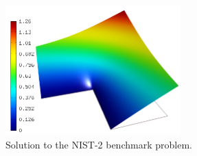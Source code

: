 \documentclass[12pt]{elsarticle}
\begin{document}
\begin{figure}[H]
\centering
\vspace{-3mm}
\includegraphics[height=5cm]{nist/nist-2/solution.png}
\vspace{-3mm}
\caption{Solution to the NIST-2 benchmark problem.}
\label{fig:sln-nist02}
\end{figure}

\end{document}
